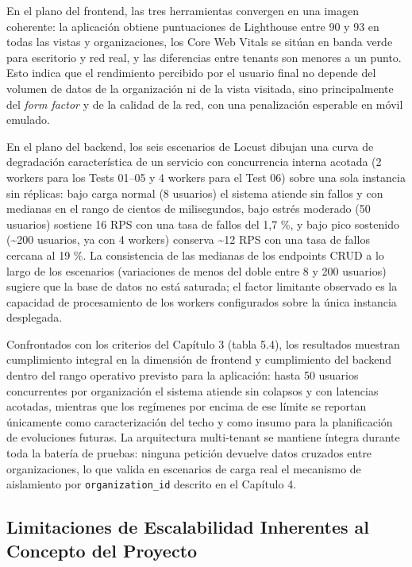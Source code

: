 En el plano del frontend, las tres herramientas convergen en una imagen coherente: la aplicación obtiene puntuaciones de Lighthouse entre 90 y 93 en todas las vistas y organizaciones, los Core Web Vitals se sitúan en banda verde para escritorio y red real, y las diferencias entre tenants son menores a un punto. Esto indica que el rendimiento percibido por el usuario final no depende del volumen de datos de la organización ni de la vista visitada, sino principalmente del \emph{form factor} y de la calidad de la red, con una penalización esperable en móvil emulado.

En el plano del backend, los seis escenarios de Locust dibujan una curva de degradación característica de un servicio con concurrencia interna acotada (2 workers para los Tests 01--05 y 4 workers para el Test 06) sobre una sola instancia sin réplicas: bajo carga normal (8 usuarios) el sistema atiende sin fallos y con medianas en el rango de cientos de milisegundos, bajo estrés moderado (50 usuarios) sostiene 16 RPS con una tasa de fallos del 1,7 \%, y bajo pico sostenido (\textasciitilde200 usuarios, ya con 4 workers) conserva \textasciitilde12 RPS con una tasa de fallos cercana al 19 \%. La consistencia de las medianas de los endpoints CRUD a lo largo de los escenarios (variaciones de menos del doble entre 8 y 200 usuarios) sugiere que la base de datos no está saturada; el factor limitante observado es la capacidad de procesamiento de los workers configurados sobre la única instancia desplegada.

Confrontados con los criterios del Capítulo 3 (tabla 5.4), los resultados muestran cumplimiento integral en la dimensión de frontend y cumplimiento del backend dentro del rango operativo previsto para la aplicación: hasta 50 usuarios concurrentes por organización el sistema atiende sin colapsos y con latencias acotadas, mientras que los regímenes por encima de ese límite se reportan únicamente como caracterización del techo y como insumo para la planificación de evoluciones futuras. La arquitectura multi-tenant se mantiene íntegra durante toda la batería de pruebas: ninguna petición devuelve datos cruzados entre organizaciones, lo que valida en escenarios de carga real el mecanismo de aislamiento por \texttt{organization\_id} descrito en el Capítulo 4.

\subsection{Limitaciones de Escalabilidad Inherentes al Concepto del Proyecto}\label{limitaciones-de-escalabilidad-inherentes-al-concepto-del-proyecto}


